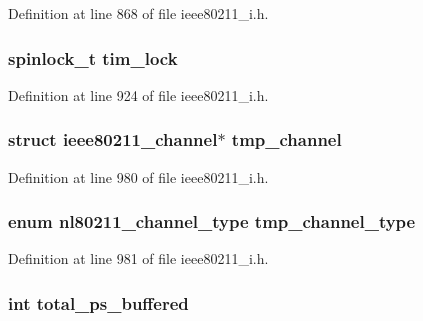 Definition at line 868 of file ieee80211\-\_\-i.\-h.

\hypertarget{structieee80211__local_a66f27f63b02e43a76482968cf728de10}{
\subsubsection[{tim\-\_\-lock}]{\setlength{\rightskip}{0pt plus 5cm}spinlock\-\_\-t tim\-\_\-lock}}\label{structieee80211__local_a66f27f63b02e43a76482968cf728de10}


Definition at line 924 of file ieee80211\-\_\-i.\-h.

\hypertarget{structieee80211__local_a846c2b9126411a975d7cdab2fb50b13e}{
\subsubsection[{tmp\-\_\-channel}]{\setlength{\rightskip}{0pt plus 5cm}struct ieee80211\-\_\-channel$\ast$ tmp\-\_\-channel}}\label{structieee80211__local_a846c2b9126411a975d7cdab2fb50b13e}


Definition at line 980 of file ieee80211\-\_\-i.\-h.

\hypertarget{structieee80211__local_adaa5be6105e3f31efe60ff88360b891f}{
\subsubsection[{tmp\-\_\-channel\-\_\-type}]{\setlength{\rightskip}{0pt plus 5cm}enum nl80211\-\_\-channel\-\_\-type tmp\-\_\-channel\-\_\-type}}\label{structieee80211__local_adaa5be6105e3f31efe60ff88360b891f}


Definition at line 981 of file ieee80211\-\_\-i.\-h.

\hypertarget{structieee80211__local_a539e95055f6bd55d800085aec0180d86}{
\subsubsection[{total\-\_\-ps\-\_\-buffered}]{\setlength{\rightskip}{0pt plus 5cm}int total\-\_\-ps\-\_\-buffered}}\label{structieee80211__local_a539e95055f6bd55d800085aec0180d86}


